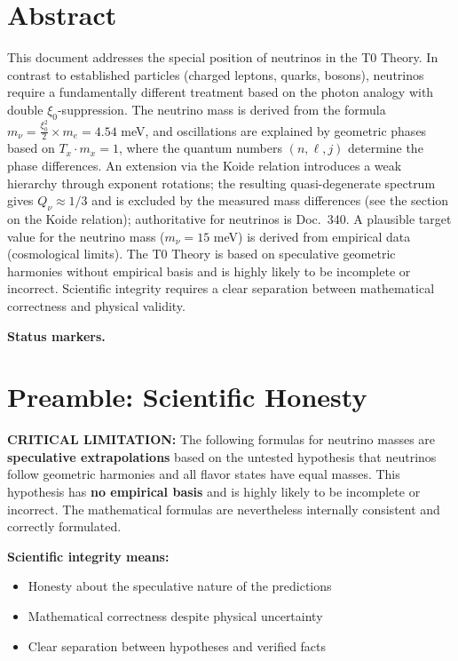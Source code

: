 \section*{Abstract}
		This document addresses the special position of neutrinos in the T0 Theory. In contrast to established particles (charged leptons, quarks, bosons), neutrinos require a fundamentally different treatment based on the photon analogy with double $\xi_0$-suppression. The neutrino mass is derived from the formula $m_\nu = \frac{\xi_0^2}{2} \times m_e = 4.54$ meV, and oscillations are explained by geometric phases based on $T_x \cdot m_x = 1$, where the quantum numbers $(n, \ell, j)$ determine the phase differences. An extension via the Koide relation introduces a weak hierarchy through exponent rotations; the resulting quasi-degenerate spectrum gives $Q_\nu \approx 1/3$ and is excluded by the measured mass differences (see the section on the Koide relation); authoritative for neutrinos is Doc.~340. A plausible target value for the neutrino mass ($m_\nu = 15$ meV) is derived from empirical data (cosmological limits). The T0 Theory is based on speculative geometric harmonies without empirical basis and is highly likely to be incomplete or incorrect. Scientific integrity requires a clear separation between mathematical correctness and physical validity.

	
	
\medskip\noindent\textbf{Status markers.}


	\section{Preamble: Scientific Honesty}
	
	\begin{warning}
		\textbf{CRITICAL LIMITATION:} The following formulas for neutrino masses are \textbf{speculative extrapolations} based on the untested hypothesis that neutrinos follow geometric harmonies and all flavor states have equal masses. This hypothesis has \textbf{no empirical basis} and is highly likely to be incomplete or incorrect. The mathematical formulas are nevertheless internally consistent and correctly formulated.
		
		\vspace{0.5cm}
		\textbf{Scientific integrity means:}
		\begin{itemize}
			\item Honesty about the speculative nature of the predictions
			\item Mathematical correctness despite physical uncertainty
			\item Clear separation between hypotheses and verified facts
		\end{itemize}
	\end{warning}
	
